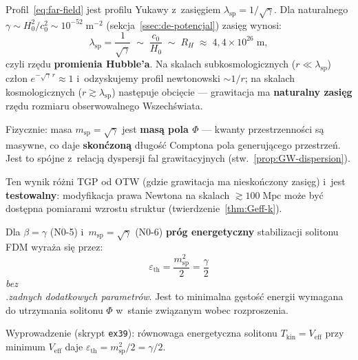 \begin{remark}%
\label{rem:yukawa-newton}
Profil~\eqref{eq:far-field} jest profilu Yukawy z~zasi\k{e}giem
$\lambda_{\mathrm{sp}} = 1/\sqrt{\gamma}$.
Dla naturalnego $\gamma \sim H_0^2/c_0^2 \sim 10^{-52}\;\mathrm{m}^{-2}$
(sekcja~\ref{ssec:de-potencjal}) zasi\k{e}g wynosi:
\begin{equation}\label{eq:yukawa-range}
  \lambda_{\mathrm{sp}} = \frac{1}{\sqrt{\gamma}}
  \;\sim\; \frac{c_0}{H_0} \;\sim\; R_H
  \;\approx\; 4{,}4 \times 10^{26}\;\mathrm{m},
\end{equation}
czyli rz\k{e}du \textbf{promienia Hubble'a}. Na skalach
subkosmologicznych ($r \ll \lambda_{\mathrm{sp}}$)
cz\l{}on $e^{-\sqrt\gamma\,r} \approx 1$ i~odzyskujemy
profil newtonowski $\sim 1/r$; na skalach kosmologicznych
($r \gtrsim \lambda_{\mathrm{sp}}$) nast\k{e}puje obci\k{e}cie
--- grawitacja ma \textbf{naturalny zasi\k{e}g} rz\k{e}du
rozmiaru obserwowalnego Wszech\'swiata.

Fizycznie: masa $m_{\mathrm{sp}} = \sqrt\gamma$ jest
\textbf{mas\k{a} pola $\Phi$} --- kwanty przestrzenno\'sci
s\k{a} masywne, co daje \textbf{skon\'czon\k{a}} d\l{}ugo\'s\'c
Comptona pola generuj\k{a}cego przestrze\'n. Jest to sp\'ojne
z~relacj\k{a} dyspersji fal grawitacyjnych
(stw.~\ref{prop:GW-dispersion}).

Ten wynik r\'o\.zni TGP od OTW (gdzie grawitacja ma
niesko\'nczony zasi\k{e}g) i~jest \textbf{testowalny}:
modyfikacja prawa Newtona na skalach $\gtrsim 100\;\mathrm{Mpc}$
mo\.ze by\'c dost\k{e}pna pomiarami wzrostu struktur
(twierdzenie~\ref{thm:Geff-k}).
\end{remark}

\begin{proposition}%
\label{prop:eps-th}
Dla $\beta = \gamma$ (N0-5) i~$m_{\mathrm{sp}} = \sqrt{\gamma}$ (N0-6)
\textbf{pr\'og energetyczny} stabilizacji solitonu FDM wyra\.za si\k{e}
przez:
\begin{equation}\label{eq:eps-th}
  \boxed{\varepsilon_{\mathrm{th}} = \frac{m_{\mathrm{sp}}^2}{2}
  = \frac{\gamma}{2}}
\end{equation}
\emph{bez \\.zadnych dodatkowych parametr\'ow}.  Jest to minimalna
g\k{e}sto\'s\'c energii wymagana do utrzymania solitonu
$\Phi$ w~stanie zwi\k{a}zanym wobec rozproszenia.

Wyprowadzenie (skrypt \texttt{ex39}): r\'ownowaga energetyczna solitonu
$T_{\mathrm{kin}} = V_{\mathrm{eff}}$ przy minimum $V_{\mathrm{eff}}$
daje $\varepsilon_{\mathrm{th}} = m_{\mathrm{sp}}^2/2 = \gamma/2$.
\end{proposition}

